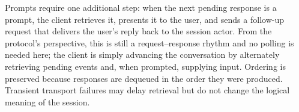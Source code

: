 Prompts require one additional step: when the next pending response is a prompt, the client retrieves it, presents it to the user, and sends a follow-up request that delivers the user's reply back to the session actor. From the protocol's perspective, this is still a request--response rhythm and no polling is needed here; the client is simply advancing the conversation by alternately retrieving pending events and, when prompted, supplying input. Ordering is preserved because responses are dequeued in the order they were produced. Transient transport failures may delay retrieval but do not change the logical meaning of the session.






%
%

